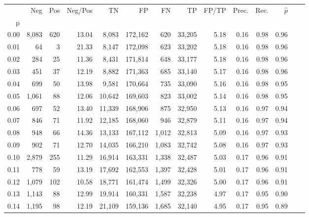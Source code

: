 \begin{tabular}{rrrrrrrrrrrrrr}
\toprule
{} &    Neg &  Pos & Neg/Pos &       TN &       FP &      FN &      TP & FP/TP & Prec. &  Rec. & $\hat{p}$ \\
p    &        &      &         &          &          &         &         &       &       &       &           \\
\midrule
0.00 &  8,083 &  620 &   13.04 &    8,083 &  172,162 &     620 &  33,205 &  5.18 &  0.16 &  0.98 &      0.96 \\
0.01 &     64 &    3 &   21.33 &    8,147 &  172,098 &     623 &  33,202 &  5.18 &  0.16 &  0.98 &      0.96 \\
0.02 &    284 &   25 &   11.36 &    8,431 &  171,814 &     648 &  33,177 &  5.18 &  0.16 &  0.98 &      0.96 \\
0.03 &    451 &   37 &   12.19 &    8,882 &  171,363 &     685 &  33,140 &  5.17 &  0.16 &  0.98 &      0.96 \\
0.04 &    699 &   50 &   13.98 &    9,581 &  170,664 &     735 &  33,090 &  5.16 &  0.16 &  0.98 &      0.95 \\
0.05 &  1,061 &   88 &   12.06 &   10,642 &  169,603 &     823 &  33,002 &  5.14 &  0.16 &  0.98 &      0.95 \\
0.06 &    697 &   52 &   13.40 &   11,339 &  168,906 &     875 &  32,950 &  5.13 &  0.16 &  0.97 &      0.94 \\
0.07 &    846 &   71 &   11.92 &   12,185 &  168,060 &     946 &  32,879 &  5.11 &  0.16 &  0.97 &      0.94 \\
0.08 &    948 &   66 &   14.36 &   13,133 &  167,112 &   1,012 &  32,813 &  5.09 &  0.16 &  0.97 &      0.93 \\
0.09 &    902 &   71 &   12.70 &   14,035 &  166,210 &   1,083 &  32,742 &  5.08 &  0.16 &  0.97 &      0.93 \\
0.10 &  2,879 &  255 &   11.29 &   16,914 &  163,331 &   1,338 &  32,487 &  5.03 &  0.17 &  0.96 &      0.91 \\
0.11 &    778 &   59 &   13.19 &   17,692 &  162,553 &   1,397 &  32,428 &  5.01 &  0.17 &  0.96 &      0.91 \\
0.12 &  1,079 &  102 &   10.58 &   18,771 &  161,474 &   1,499 &  32,326 &  5.00 &  0.17 &  0.96 &      0.91 \\
0.13 &  1,143 &   88 &   12.99 &   19,914 &  160,331 &   1,587 &  32,238 &  4.97 &  0.17 &  0.95 &      0.90 \\
0.14 &  1,195 &   98 &   12.19 &   21,109 &  159,136 &   1,685 &  32,140 &  4.95 &  0.17 &  0.95 &      0.89 \\

\end{tabular}
